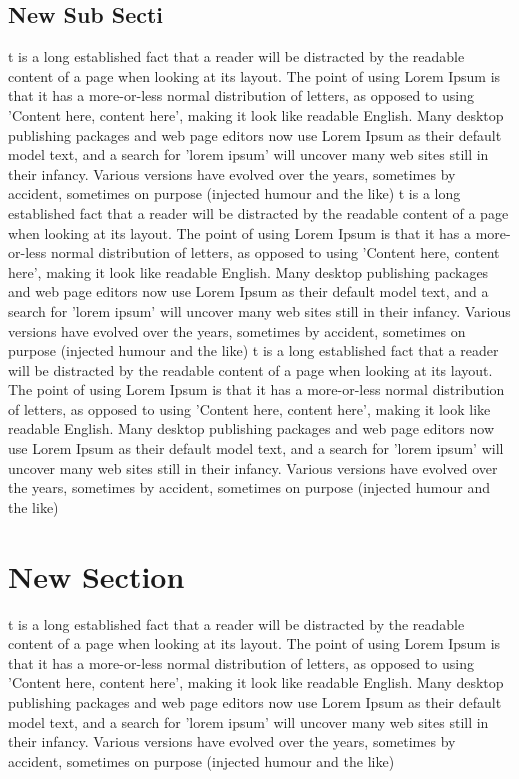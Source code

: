 \documentclass[]{article}
\begin{document}
\subsection{New Sub Secti}
t is a long established fact that a reader will be distracted by the readable content of a page when looking at its layout. The point of using Lorem Ipsum is that it has a more-or-less normal distribution of letters, as opposed to using 'Content here, content here', making it look like readable English. Many desktop publishing packages and web page editors now use Lorem Ipsum as their default model text, and a search for 'lorem ipsum' will uncover many web sites still in their infancy. Various versions have evolved over the years, sometimes by accident, sometimes on purpose (injected humour and the like)
t is a long established fact that a reader will be distracted by the readable content of a page when looking at its layout. The point of using Lorem Ipsum is that it has a more-or-less normal distribution of letters, as opposed to using 'Content here, content here', making it look like readable English. Many desktop publishing packages and web page editors now use Lorem Ipsum as their default model text, and a search for 'lorem ipsum' will uncover many web sites still in their infancy. Various versions have evolved over the years, sometimes by accident, sometimes on purpose (injected humour and the like)
t is a long established fact that a reader will be distracted by the readable content of a page when looking at its layout. The point of using Lorem Ipsum is that it has a more-or-less normal distribution of letters, as opposed to using 'Content here, content here', making it look like readable English. Many desktop publishing packages and web page editors now use Lorem Ipsum as their default model text, and a search for 'lorem ipsum' will uncover many web sites still in their infancy. Various versions have evolved over the years, sometimes by accident, sometimes on purpose (injected humour and the like)

\section{New Section}
t is a long established fact that a reader will be distracted by the readable content of a page when looking at its layout. The point of using Lorem Ipsum is that it has a more-or-less normal distribution of letters, as opposed to using 'Content here, content here', making it look like readable English. Many desktop publishing packages and web page editors now use Lorem Ipsum as their default model text, and a search for 'lorem ipsum' will uncover many web sites still in their infancy. Various versions have evolved over the years, sometimes by accident, sometimes on purpose (injected humour and the like)
\end{document}
